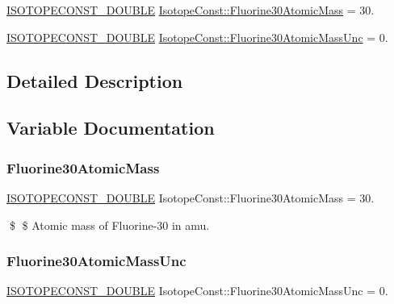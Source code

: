 \begin{DoxyCompactItemize}
\item 
\mbox{\hyperlink{group___isotope_const-_macros_ga8f45a7272ce02c0b4c65c44636ed719a}{I\+S\+O\+T\+O\+P\+E\+C\+O\+N\+S\+T\+\_\+\+D\+O\+U\+B\+LE}} \mbox{\hyperlink{group___isotope_const-_fluorine-_f30_ga25203177450d33b1efef5fdbe21fcb77}{Isotope\+Const\+::\+Fluorine30\+Atomic\+Mass}} = 30.
\item 
\mbox{\hyperlink{group___isotope_const-_macros_ga8f45a7272ce02c0b4c65c44636ed719a}{I\+S\+O\+T\+O\+P\+E\+C\+O\+N\+S\+T\+\_\+\+D\+O\+U\+B\+LE}} \mbox{\hyperlink{group___isotope_const-_fluorine-_f30_ga91dc7ec0c497707c215c953dbd2631ce}{Isotope\+Const\+::\+Fluorine30\+Atomic\+Mass\+Unc}} = 0.
\end{DoxyCompactItemize}


\subsection{Detailed Description}


\subsection{Variable Documentation}
\mbox{\label{group___isotope_const-_fluorine-_f30_ga25203177450d33b1efef5fdbe21fcb77}} 
\subsubsection{\texorpdfstring{Fluorine30\+Atomic\+Mass}{Fluorine30AtomicMass}}
{\footnotesize\ttfamily \mbox{\hyperlink{group___isotope_const-_macros_ga8f45a7272ce02c0b4c65c44636ed719a}{I\+S\+O\+T\+O\+P\+E\+C\+O\+N\+S\+T\+\_\+\+D\+O\+U\+B\+LE}} Isotope\+Const\+::\+Fluorine30\+Atomic\+Mass = 30.}

\$ \$ Atomic mass of Fluorine-\/30 in amu. \mbox{\label{group___isotope_const-_fluorine-_f30_ga91dc7ec0c497707c215c953dbd2631ce}} 
\subsubsection{\texorpdfstring{Fluorine30\+Atomic\+Mass\+Unc}{Fluorine30AtomicMassUnc}}
{\footnotesize\ttfamily \mbox{\hyperlink{group___isotope_const-_macros_ga8f45a7272ce02c0b4c65c44636ed719a}{I\+S\+O\+T\+O\+P\+E\+C\+O\+N\+S\+T\+\_\+\+D\+O\+U\+B\+LE}} Isotope\+Const\+::\+Fluorine30\+Atomic\+Mass\+Unc = 0.}

